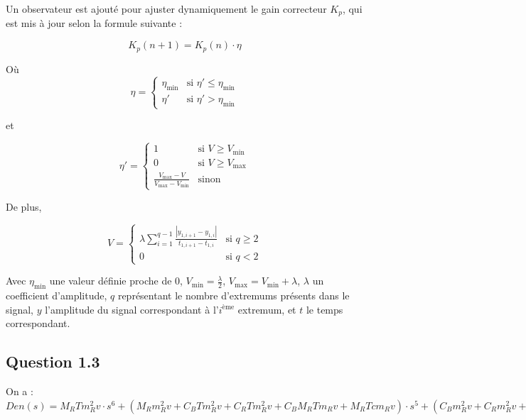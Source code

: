 \documentclass[a4paper,11pt]{article}
\begin{document}
Un observateur est ajouté pour ajuster dynamiquement le gain correcteur $K_{p}$, qui est mis à jour selon la formule suivante :

\[
K_{p}(n+1) = K_{p}(n) \cdot \eta
\]

Où
\[
\eta =
\begin{cases}
    \eta_{\text{min}} & \text{si } \eta' \leq \eta_{\text{min}} \\
    \eta' & \text{si } \eta' > \eta_{\text{min}}
\end{cases}
\]

et

\[
\eta' =
\begin{cases}
    1 & \text{si } V \geq V_{\text{min}} \\
    0 & \text{si } V \geq V_{\text{max}} \\
    \frac{V_{\text{max}} - V}{V_{\text{max}} - V_{\text{min}}} & \text{sinon}
\end{cases}
\]

De plus,

\[
V =
\begin{cases}
    \lambda \sum_{i=1}^{q-1} \frac{\left| y_{1,i+1} - y_{1,i} \right|}{t_{1,i+1} - t_{1,i}} & \text{si } q \geq 2 \\
    0 & \text{si } q < 2
\end{cases}
\]

Avec $\eta_{\text{min}}$ une valeur définie proche de 0, $V_{\text{min}} = \frac{\lambda}{2}$, $V_{\text{max}} = V_{\text{min}} + \lambda$, $\lambda$ un coefficient d’amplitude, $q$ représentant le nombre d’extremums présents dans le signal, $y$ l’amplitude du signal correspondant à l'${i}^{\text{ème}}$ extremum, et $t$ le temps correspondant.

\subsection{Question 1.3}
On a : \\
$Den(s)=M_R T m_R^2 v \cdot s^6 + (M_R m_R^2 v + C_B T m_R^2 v + C_R T m_R^2 v + C_B M_R T m_R v + M_R T c m_R v) \cdot s^5 + (C_B m_R^2 v + C_R m_R^2 v + K_B T m_R^2 v + C_B M_R m_R v + K_p M_R m_R v + M_R c m_R v + C_B M_R T c v + C_B C_R T m_R v + K_B M_R T m_R v + C_B T c m_R v + C_R T c m_R v) \cdot s^4 + (K_B m_R^2 v + C_B M_R c v + C_B C_R m_R v + C_B K_p m_R v + K_p M_R c v + C_R K_p m_R v + K_B M_R m_R v + C_B c m_R v + C_R c m_R v + C_B C_R T c v + K_B M_R T c v + C_R K T m_R v + K_B T c m_R v) \cdot s^3 + (C_B C_R c v + C_B K_p c v + C_R K_p c v + K_B M_R c v + C_R K m_R v + K K_p m_R v + K c m_R v + C_R K T c v) \cdot s^2 + (C_B K_h K_p + C_R K c v + K K_p c v) \cdot s + K_B K_h K_p$
\\
\end{document}
